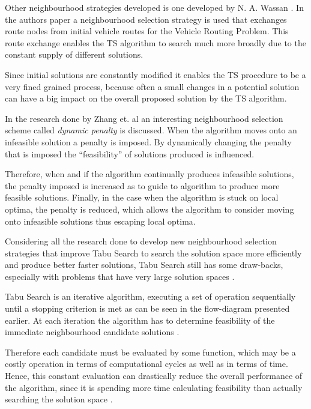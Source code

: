 Other neighbourhood strategies developed is one developed by N. A. Wassan \cite{ReactiveTabuVHR}. In the authors paper a neighbourhood selection strategy is used that exchanges route nodes from initial vehicle routes for the Vehicle Routing Problem. This route exchange enables the TS algorithm to search much more broadly due to the constant supply of different solutions. 

Since initial solutions are constantly modified it enables the TS procedure to be a very fined grained process, because often a small changes in a potential solution can have a big impact on the overall proposed solution by the TS algorithm.

In the research done by Zhang et. al \cite{TSHazardous} an interesting neighbourhood selection scheme called \emph{dynamic penalty} is discussed. When the algorithm moves onto an infeasible solution a penalty is imposed. By dynamically changing the penalty that is imposed the ``feasibility'' of solutions produced is influenced. 

Therefore, when and if the algorithm continually produces infeasible solutions, the penalty imposed is increased as to guide to algorithm to produce more feasible solutions. Finally, in the case when the algorithm is stuck on local optima, the penalty is reduced, which allows the algorithm to consider moving onto infeasible solutions thus escaping local optima.

Considering all the research done to develop new neighbourhood selection strategies that improve Tabu Search to search the solution space more efficiently and produce better faster solutions, Tabu Search still has some draw-backs, especially with problems that have very large solution spaces \cite{EvoParallelTabu}.

Tabu Search is an iterative algorithm, executing a set of operation sequentially until a stopping criterion is met as can be seen in the flow-diagram presented earlier. At each iteration the algorithm has to determine feasibility of the immediate neighbourhood candidate solutions \cite{EvoParallelTabu,TabuVechicleRoutingWithTimeWindows}. 

Therefore each candidate must be evaluated by some function, which may be a costly operation in terms of computational cycles as well as in terms of time. Hence, this constant evaluation can drastically reduce the overall performance of the algorithm, since it is spending more time calculating feasibility than actually searching the solution space \cite{EvoParallelTabu,TabuVechicleRoutingWithTimeWindows}.

